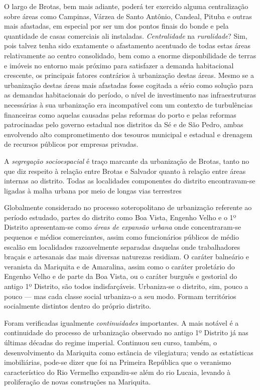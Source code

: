 O largo de Brotas, bem mais adiante, poderá ter exercido alguma centralização sobre áreas como Campinas, Várzea de Santo Antônio, Candeal, Pituba e outras mais afastadas, em especial por ser um dos pontos finais do bonde e pela quantidade de casas comerciais ali instaladas. \textit{Centralidade} na \textit{ruralidade}? Sim, pois talvez tenha sido exatamente o afastamento acentuado de todas estas áreas relativamente ao centro consolidado, bem como a enorme disponbilidade de terras e imóveis no entorno mais próximo para satisfazer a demanda habitacional crescente, os principais fatores contrários à urbanização destas áreas. Mesmo se a urbanização destas áreas mais afastadas fosse cogitada a sério como solução para as demandas habitacionais do período, o nível de investimento nas infraestruturas necessárias à sua urbanização era incompatível com um contexto de turbulências financeiras como aquelas causadas pelas reformas do porto e pelas reformas patrocinadas pelo governo estadual nos distritos da Sé e de São Pedro, ambas envolvendo alto comprometimento dos tesouros municipal e estadual e drenagem de recursos públicos por empresas privadas.

A \textit{segregação socioespacial} é traço marcante da urbanização de Brotas, tanto no que diz respeito à relação entre Brotas e Salvador quanto à relação entre áreas internas ao distrito. Todas as localidades componentes do distrito encontravam-se ligadas à malha urbana por meio de longas vias terrestres

Globalmente considerado no processo soteropolitano de urbanização referente ao período estudado, partes do distrito como Boa Vista, Engenho Velho e o 1º Distrito apresentam-se como \textit{áreas de expansão urbana} onde concentraram-se pequenos e médios comerciantes, assim como funcionários públicos de médio escalão em localidades razoavelmente separadas daquelas onde trabalhadores braçais e artesanais das mais diversas naturezas residiam. O caráter balneário e veranista da Mariquita e de Amaralina, assim como o caráter proletário do Engenho Velho e de parte da Boa Vista, ou o caráter burguês e gestorial do antigo 1º Distrito, são todos indisfarçáveis. Urbaniza-se o distrito, sim, pouco a pouco --- mas cada classe social urbaniza-o a seu modo. Formam territórios socialmente distintos dentro do próprio distrito.

Foram verificadas igualmente \textit{continuidades} importantes. A mais notável é a continuidade do processo de urbanização observado no antigo 1º Distrito já nas últimas décadas do regime imperial. Continuou seu curso, também, o desenvolvimento da Mariquita como estância de vilegiatura; vendo as estatísticas imobiliárias, pode-se dizer que foi na Primeira República que o veranismo característico do Rio Vermelho expandiu-se além do rio Lucaia, levando à proliferação de novas construções na Mariquita. 

